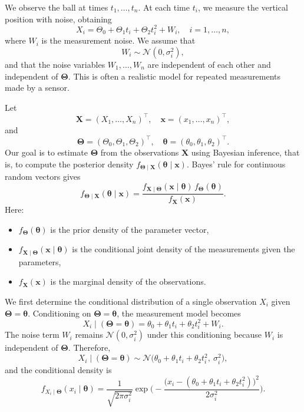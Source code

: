 We observe the ball at times \(t_{1},\dots,t_{n}\).  
At each time \(t_{i}\), we measure the vertical position with noise, obtaining
\[
X_{i}
=
\Theta_{0} + \Theta_{1} t_{i} + \Theta_{2} t_{i}^{2} + W_{i},
\quad
i = 1,\dots,n,
\]
where \(W_{i}\) is the measurement noise.  
We assume that
\[
W_{i} \sim \mathcal{N}(0,\sigma_{i}^{2}),
\]
and that the noise variables \(W_{1},\dots,W_{n}\) are independent of each other and independent of \(\boldsymbol{\Theta}\).  
This is often a realistic model for repeated measurements made by a sensor.

Let
\[
\mathbf{X}
=
(X_{1},\dots,X_{n})^{\top},
\quad
\mathbf{x}
=
(x_{1},\dots,x_{n})^{\top},
\]
and
\[
\boldsymbol{\Theta}
=
(\Theta_{0},\Theta_{1},\Theta_{2})^{\top},
\quad
\boldsymbol{\theta}
=
(\theta_{0},\theta_{1},\theta_{2})^{\top}.
\]
Our goal is to estimate \(\boldsymbol{\Theta}\) from the observations \(\mathbf{X}\) using Bayesian inference, that is, to compute the posterior density \(f_{\boldsymbol{\Theta}\mid \mathbf{X}}(\boldsymbol{\theta}\mid \mathbf{x})\).  
Bayes' rule for continuous random vectors gives
\[
f_{\boldsymbol{\Theta}\mid \mathbf{X}}(\boldsymbol{\theta}\mid \mathbf{x})
=
\frac{f_{\mathbf{X}\mid \boldsymbol{\Theta}}(\mathbf{x}\mid \boldsymbol{\theta})\,f_{\boldsymbol{\Theta}}(\boldsymbol{\theta})}{f_{\mathbf{X}}(\mathbf{x})}.
\]
Here:
\begin{itemize}
\item \(f_{\boldsymbol{\Theta}}(\boldsymbol{\theta})\) is the prior density of the parameter vector,
\item \(f_{\mathbf{X}\mid \boldsymbol{\Theta}}(\mathbf{x}\mid \boldsymbol{\theta})\) is the conditional joint density of the measurements given the parameters,
\item \(f_{\mathbf{X}}(\mathbf{x})\) is the marginal density of the observations.
\end{itemize}

We first determine the conditional distribution of a single observation \(X_{i}\) given \(\boldsymbol{\Theta} = \boldsymbol{\theta}\).  
Conditioning on \(\boldsymbol{\Theta} = \boldsymbol{\theta}\), the measurement model becomes
\[
X_{i} \mid (\boldsymbol{\Theta} = \boldsymbol{\theta})
=
\theta_{0} + \theta_{1} t_{i} + \theta_{2} t_{i}^{2} + W_{i}.
\]
The noise term \(W_{i}\) remains \(\mathcal{N}(0,\sigma_{i}^{2})\) under this conditioning because \(W_{i}\) is independent of \(\boldsymbol{\Theta}\).  
Therefore,
\[
X_{i} \mid (\boldsymbol{\Theta} = \boldsymbol{\theta})
\sim
\mathcal{N}\big(\theta_{0} + \theta_{1} t_{i} + \theta_{2} t_{i}^{2},\ \sigma_{i}^{2}\big),
\]
and the conditional density is
\[
f_{X_{i}\mid \boldsymbol{\Theta}}(x_{i}\mid \boldsymbol{\theta})
=
\frac{1}{\sqrt{2\pi\sigma_{i}^{2}}}
\exp\Bigg(
-\frac{\big(x_{i} - (\theta_{0} + \theta_{1} t_{i} + \theta_{2} t_{i}^{2})\big)^{2}}{2\sigma_{i}^{2}}
\Bigg).
\]

